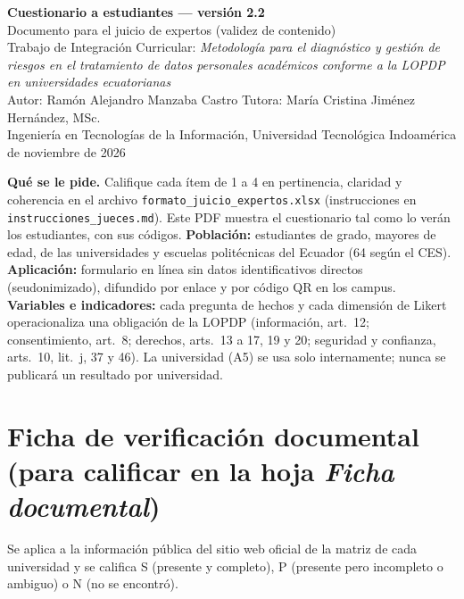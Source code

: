 \documentclass[11pt,a4paper]{article}
\begin{document}
\begin{center}
{\large\textbf{Cuestionario a estudiantes --- versión 2.2}}\\[2pt]
Documento para el juicio de expertos (validez de contenido)\\[2pt]
\small Trabajo de Integración Curricular: \textit{Metodología para el diagnóstico y gestión de riesgos en el tratamiento de datos personales académicos conforme a la LOPDP en universidades ecuatorianas}\\
Autor: Ramón Alejandro Manzaba Castro \quad Tutora: María Cristina Jiménez Hernández, MSc.\\
Ingeniería en Tecnologías de la Información, Universidad Tecnológica Indoamérica  de noviembre de 2026
\end{center}

\textbf{Qué se le pide.} Califique cada ítem de 1 a 4 en pertinencia, claridad y coherencia en el archivo \texttt{formato\_juicio\_expertos.xlsx} (instrucciones en \texttt{instrucciones\_jueces.md}). Este PDF muestra el cuestionario tal como lo verán los estudiantes, con sus códigos. \textbf{Población:} estudiantes de grado, mayores de edad, de las universidades y escuelas politécnicas del Ecuador (64 según el CES). \textbf{Aplicación:} formulario en línea sin datos identificativos directos (seudonimizado), difundido por enlace y por código QR en los campus. \textbf{Variables e indicadores:} cada pregunta de hechos y cada dimensión de Likert operacionaliza una obligación de la LOPDP (información, art.~12; consentimiento, art.~8; derechos, arts.~13 a 17, 19 y 20; seguridad y confianza, arts.~10, lit.~j, 37 y 46). La universidad (A5) se usa solo internamente; nunca se publicará un resultado por universidad.



\section*{Ficha de verificación documental (para calificar en la hoja \textit{Ficha documental})}

Se aplica a la información pública del sitio web oficial de la matriz de cada universidad y se califica S (presente y completo), P (presente pero incompleto o ambiguo) o N (no se encontró).
\end{document}
